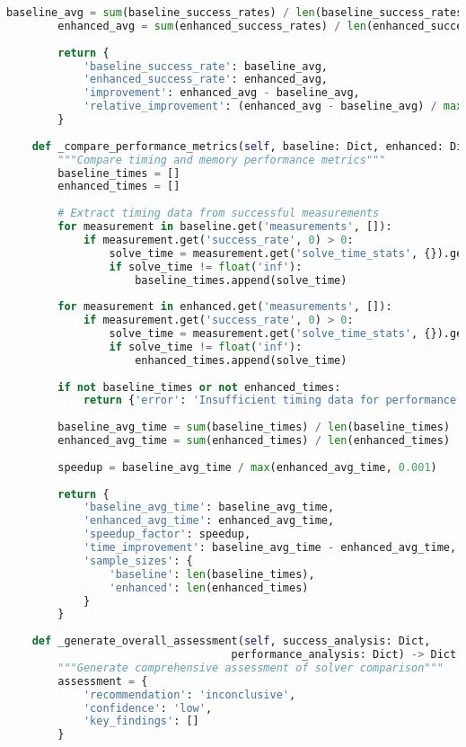 \begin{lstlisting}[language=Python, caption=Statistical Analysis and Comparison Framework]
        baseline_avg = sum(baseline_success_rates) / len(baseline_success_rates)
        enhanced_avg = sum(enhanced_success_rates) / len(enhanced_success_rates)
        
        return {
            'baseline_success_rate': baseline_avg,
            'enhanced_success_rate': enhanced_avg,
            'improvement': enhanced_avg - baseline_avg,
            'relative_improvement': (enhanced_avg - baseline_avg) / max(baseline_avg, 0.001)
        }
    
    def _compare_performance_metrics(self, baseline: Dict, enhanced: Dict) -> Dict:
        """Compare timing and memory performance metrics"""
        baseline_times = []
        enhanced_times = []
        
        # Extract timing data from successful measurements
        for measurement in baseline.get('measurements', []):
            if measurement.get('success_rate', 0) > 0:
                solve_time = measurement.get('solve_time_stats', {}).get('mean', float('inf'))
                if solve_time != float('inf'):
                    baseline_times.append(solve_time)
        
        for measurement in enhanced.get('measurements', []):
            if measurement.get('success_rate', 0) > 0:
                solve_time = measurement.get('solve_time_stats', {}).get('mean', float('inf'))
                if solve_time != float('inf'):
                    enhanced_times.append(solve_time)
        
        if not baseline_times or not enhanced_times:
            return {'error': 'Insufficient timing data for performance comparison'}
        
        baseline_avg_time = sum(baseline_times) / len(baseline_times)
        enhanced_avg_time = sum(enhanced_times) / len(enhanced_times)
        
        speedup = baseline_avg_time / max(enhanced_avg_time, 0.001)
        
        return {
            'baseline_avg_time': baseline_avg_time,
            'enhanced_avg_time': enhanced_avg_time,
            'speedup_factor': speedup,
            'time_improvement': baseline_avg_time - enhanced_avg_time,
            'sample_sizes': {
                'baseline': len(baseline_times),
                'enhanced': len(enhanced_times)
            }
        }
    
    def _generate_overall_assessment(self, success_analysis: Dict, 
                                   performance_analysis: Dict) -> Dict:
        """Generate comprehensive assessment of solver comparison"""
        assessment = {
            'recommendation': 'inconclusive',
            'confidence': 'low',
            'key_findings': []
        }
        

\end{lstlisting}
